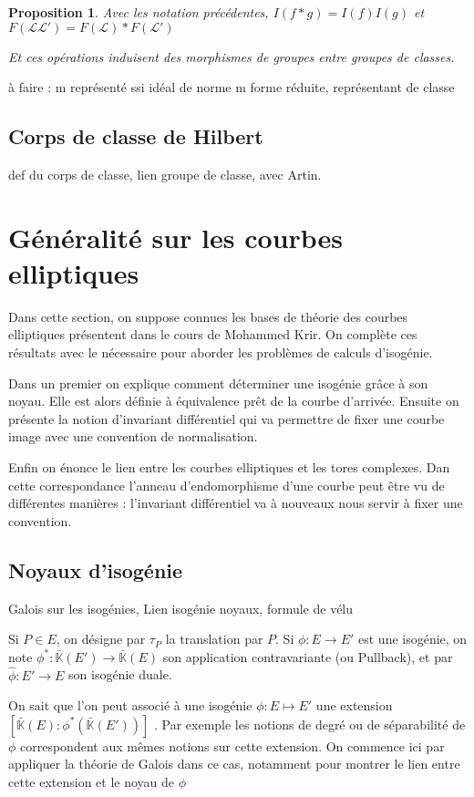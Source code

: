 \documentclass{article}
\newcommand{\K}[0]{\mathbb{K}}
\newcommand{\Kb}[0]{\bar{\K}}
\newcommand{\LR}[0]{\mathcal{L}}
\newtheorem{Prop}[The]{Proposition}
\begin{document}
\begin{Prop}
	Avec les notation précédentes, $I(f*g) = I(f)I(g)$ et $F(\LR\LR') = F(\LR)*F(\LR')$
	
	Et ces opérations induisent des morphismes de groupes entre groupes de classes.
\end{Prop}

à faire : m représenté ssi idéal de norme m
forme réduite, représentant de classe

\subsection{Corps de classe de Hilbert}
 def du corps de classe, lien groupe de classe, avec Artin. 

\section{Généralité sur les courbes elliptiques}

Dans cette section, on suppose connues les bases de théorie des courbes elliptiques présentent dans le cours de Mohammed Krir. On complète ces résultats avec le nécessaire pour aborder les problèmes de calculs d'isogénie. 

Dans un premier on explique comment déterminer une isogénie grâce à son noyau. Elle est alors définie à équivalence prêt de la courbe d'arrivée. Ensuite on présente la notion d'invariant différentiel qui va permettre de fixer une courbe image avec une convention de normalisation. 

Enfin on énonce le lien entre les courbes elliptiques et les tores complexes. Dan cette correspondance l’anneau d'endomorphisme d'une courbe peut être vu de différentes manières : l'invariant différentiel va à nouveaux nous servir à fixer une convention. 

\subsection{Noyaux d'isogénie}
Galois sur les isogénies, Lien isogénie noyaux, formule de vélu

Si $P\in E$, on désigne par $\tau_{P}$ la translation par $P$. Si $\phi : E\rightarrow E'$ est une isogénie, on note $\phi^{*} : \Kb(E') \rightarrow \Kb(E)$ son application contravariante (ou Pullback), et par $\hat{\phi} : E'\rightarrow E$ son isogénie duale.

On sait que l'on peut associé à une isogénie $\phi : E\mapsto E'$ une extension $\left[ \Kb(E) : \phi^{*}\left( \Kb(E')\right) \right]$ . Par exemple les notions de degré ou de séparabilité de $\phi$ correspondent aux mêmes notions sur cette extension. On commence ici par appliquer la théorie de Galois dans ce cas, notamment pour montrer le lien entre cette extension et le noyau de $\phi$
\end{document}

